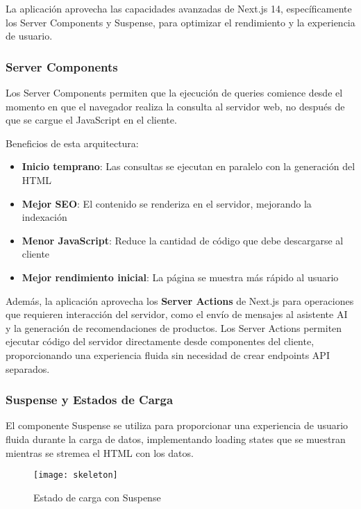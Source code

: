 La aplicación aprovecha las capacidades avanzadas de Next.js 14, específicamente los Server Components y Suspense, para optimizar el rendimiento y la experiencia de usuario.

\subsubsection{Server Components}

Los Server Components permiten que la ejecución de queries comience desde el momento en que el navegador realiza la consulta al servidor web, no después de que se cargue el JavaScript en el cliente.


Beneficios de esta arquitectura:
\begin{itemize}
    \item \textbf{Inicio temprano}: Las consultas se ejecutan en paralelo con la generación del HTML
    \item \textbf{Mejor SEO}: El contenido se renderiza en el servidor, mejorando la indexación
    \item \textbf{Menor JavaScript}: Reduce la cantidad de código que debe descargarse al cliente
    \item \textbf{Mejor rendimiento inicial}: La página se muestra más rápido al usuario
\end{itemize}

Además, la aplicación aprovecha los \textbf{Server Actions} de Next.js para operaciones que requieren interacción del servidor, como el envío de mensajes al asistente AI y la generación de recomendaciones de productos. Los Server Actions permiten ejecutar código del servidor directamente desde componentes del cliente, proporcionando una experiencia fluida sin necesidad de crear endpoints API separados.

\subsubsection{Suspense y Estados de Carga}

El componente Suspense se utiliza para proporcionar una experiencia de usuario fluida durante la carga de datos, implementando loading states que se muestran mientras se stremea el HTML con los datos.

\begin{figure}[H]
    \centering
    \texttt{[image: skeleton]}
    \caption{Estado de carga con Suspense}
\end{figure}



